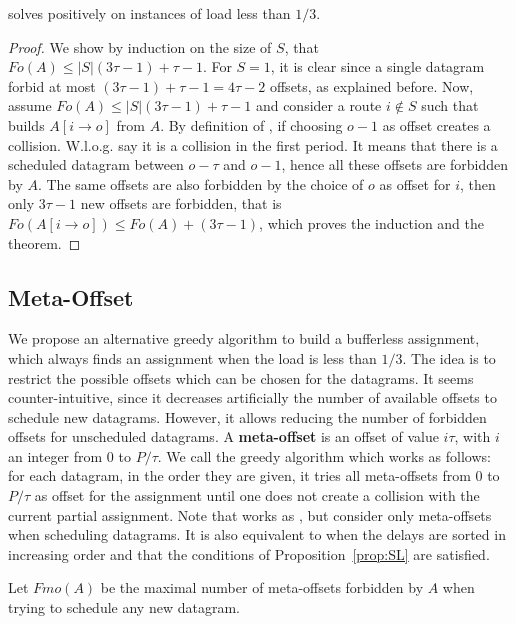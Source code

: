 \begin{theorem}
\firstfit solves \pma positively on instances of load less than $1/3$. 
\end{theorem}
\begin{proof}
We show by induction on the size of $S$, that $Fo(A) \leq |S|(3\tau -1) + \tau -1$. For $S = 1$, it is clear since a single datagram forbid at most $(3\tau -1) + \tau -1 = 4\tau-2$ offsets, as explained before. Now, assume $Fo(A) \leq |S|(3\tau -1) + \tau -1$ and consider a route $i \notin S$ such that \firstfit builds $A[i \rightarrow o]$ from $A$. By definition of \firstfit, if choosing $o-1$ as offset creates a collision. W.l.o.g. say it is a collision in the first period. It means that there is a scheduled datagram between $o - \tau $ and $o-1$, hence all these offsets are forbidden by $A$. The same offsets are also forbidden by the choice of $o$ as offset for $i$, then only $3\tau -1$ new offsets are forbidden, that is $Fo(A[i \rightarrow o]) \leq Fo(A) + (3\tau -1)$, which proves the induction and the theorem.
\end{proof}

\subsection{Meta-Offset}

     We propose an alternative greedy algorithm to build a bufferless assignment, which always finds an assignment when the load is less than $1/3$.  
     The idea is to restrict the possible offsets which can be chosen for the datagrams. It seems counter-intuitive, since it decreases artificially the number of available offsets to schedule new datagrams. However, it allows reducing the number of forbidden offsets for unscheduled datagrams. A \textbf{meta-offset} is an offset of value $i\tau$, with $i$ an integer from $0$ to $P / \tau$. We call \metaoffset the greedy algorithm which works as follows: for each datagram, in the order they are given, it tries all meta-offsets from $0$ to $P/\tau$ as offset for the assignment until one does not create a collision with the current partial assignment. Note that \metaoffset works as \firstfit, but consider only meta-offsets when scheduling datagrams. It is also equivalent to \shortestlongest when the delays are sorted in increasing order and that the conditions of Proposition~\ref{prop:SL} are satisfied.

     Let $Fmo(A)$ be the maximal number of meta-offsets forbidden by $A$ when trying to schedule any new datagram. 



